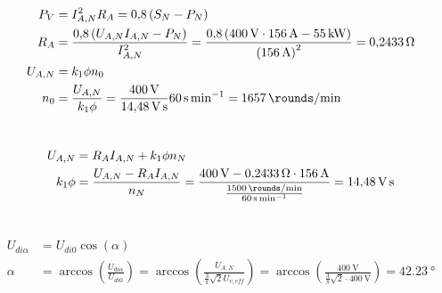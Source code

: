 \documentclass[11pt,a4paper]{scrartcl}
\newcommand{\mybr}[1]{\left(#1\right)}
\newcommand{\0}{_{\mybr{0}}}
\newcommand{\1}{_{\mybr{1}}}
\newcommand{\2}{_{\mybr{2}}}
\begin{document}
\section{}
\begin{align}
P_V&=I_{A,N}^2 R_A=\num{0.8}\mybr{S_N-P_N}\\
R_A&=\frac{\num{0.8}\mybr{U_{A,N}I_{A,N}-P_N}}{I_{A,N}^2}=\frac{\num{0.8}\mybr{\SI{400}{\volt}\cdot\SI{156}{\ampere}-\SI{55}{\kilo\watt}}}{\mybr{\SI{156}{\ampere}}^2}=\SI{0.2433}{\ohm}\\
U_{A,N}&=k_1\phi n_0\\
n_0&=\frac{U_{A,N}}{k_1\phi}=\frac{\SI{400}{\volt}}{\SI{14.48}{\volt\second}}\SI{60}{\second\per\minute}=\SI{1657}{\rounds\per\minute}
\end{align}

\section{}
\begin{align}
U_{A,N}&=R_A I_{A,N} + k_1 \phi n_N\\
k_1\phi&=\frac{U_{A,N}-R_A I_{A,N}}{n_N}=\frac{\SI{400}{\volt}-\SI{0.2433}{\ohm}\cdot\SI{156}{\ampere}}{\frac{\SI{1500}{\rounds\per\minute}}{\SI{60}{\second\per\minute}}}=\SI{14.48}{\volt\second}
\end{align}

\section{}
\begin{align}
U_{di\alpha}&=U_{di0}\cos\mybr{\alpha}\\
\alpha&=\arccos\mybr{\frac{U_{di\alpha}}{U_{di0}}}=\arccos\mybr{\frac{U_{A,N}}{\frac{3}{\pi}\sqrt{2}U_{v,eff}}}=\arccos\mybr{\frac{\SI{400}{\volt}}{\frac{3}{\pi}\sqrt{2}\cdot\SI{400}{\volt}}}=\SI{42.23}{\degree}
\end{align}

\section{}
\end{document}
